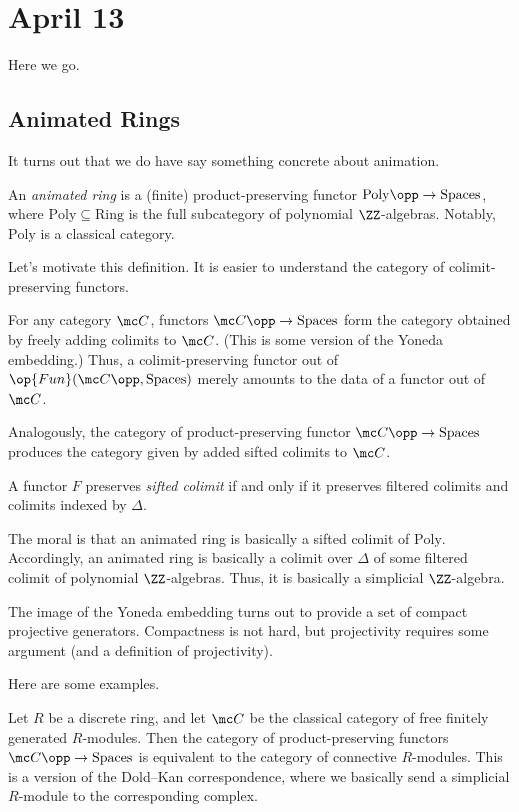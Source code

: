 \documentclass[../notes.tex]{subfiles}
\begin{document}
\section{April 13}
Here we go.

\subsection{Animated Rings}
It turns out that we do have say something concrete about animation.
\begin{definition}
	An \textit{animated ring} is a (finite) product-preserving functor $\mathrm{Poly}\opp\to\mathrm{Spaces}$, where $\mathrm{Poly}\subseteq\mathrm{Ring}$ is the full subcategory of polynomial $\ZZ$-algebras. Notably, $\mathrm{Poly}$ is a classical category.
\end{definition}
Let's motivate this definition. It is easier to understand the category of colimit-preserving functors.
\begin{remark}
	For any category $\mc C$, functors $\mc C\opp\to\mathrm{Spaces}$ form the category obtained by freely adding colimits to $\mc C$. (This is some version of the Yoneda embedding.) Thus, a colimit-preserving functor out of $\op{Fun}(\mc C\opp,\mathrm{Spaces})$ merely amounts to the data of a functor out of $\mc C$.
\end{remark}
Analogously, the category of product-preserving functor $\mc C\opp\to\mathrm{Spaces}$ produces the category given by added sifted colimits to $\mc C$.
\begin{definition}
	A functor $F$ preserves \textit{sifted colimit} if and only if it preserves filtered colimits and colimits indexed by $\Delta$.
\end{definition}
\begin{example}
	The moral is that an animated ring is basically a sifted colimit of $\mathrm{Poly}$. Accordingly, an animated ring is basically a colimit over $\Delta$ of some filtered colimit of polynomial $\ZZ$-algebras. Thus, it is basically a simplicial $\ZZ$-algebra.
\end{example}
\begin{remark}
	The image of the Yoneda embedding turns out to provide a set of compact projective generators. Compactness is not hard, but projectivity requires some argument (and a definition of projectivity).
\end{remark}
Here are some examples.
\begin{example}
	Let $R$ be a discrete ring, and let $\mc C$ be the classical category of free finitely generated $R$-modules. Then the category of product-preserving functors $\mc C\opp\to\mathrm{Spaces}$ is equivalent to the category of connective $R$-modules. This is a version of the Dold--Kan correspondence, where we basically send a simplicial $R$-module to the corresponding complex.
\end{example}
\end{document}
